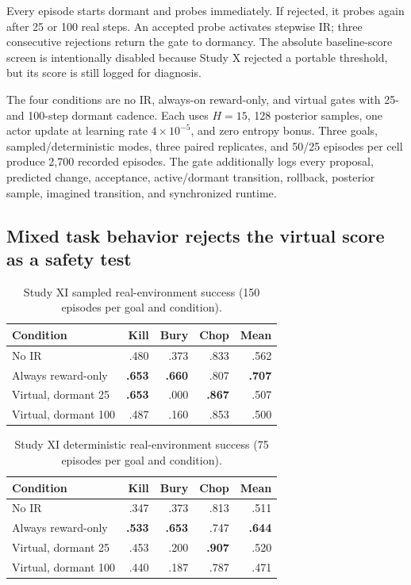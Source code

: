 \documentclass[10pt]{article}
\begin{document}
Every episode starts dormant and probes immediately. If rejected, it probes
again after 25 or 100 real steps. An accepted probe activates stepwise IR;
three consecutive rejections return the gate to dormancy. The absolute
baseline-score screen is intentionally disabled because Study X rejected a
portable threshold, but its score is still logged for diagnosis.

The four conditions are no IR, always-on reward-only, and virtual gates with
25- and 100-step dormant cadence. Each uses $H=15$, 128 posterior samples, one
actor update at learning rate $4\times10^{-5}$, and zero entropy bonus. Three
goals, sampled/deterministic modes, three paired replicates, and 50/25 episodes
per cell produce 2,700 recorded episodes. The gate additionally logs every
proposal, predicted change, acceptance, active/dormant transition, rollback,
posterior sample, imagined transition, and synchronized runtime.

\subsection{Mixed task behavior rejects the virtual score as a safety test}

\begin{table}[H]
\centering
\small
\caption{Study XI sampled real-environment success (150 episodes per goal and condition).}
\label{tab:stage5b2sampled}
\begin{tabular}{lrrrr}
\toprule
Condition & Kill & Bury & Chop & Mean \\
\midrule
No IR & .480 & .373 & .833 & .562 \\
Always reward-only & \textbf{.653} & \textbf{.660} & .807 & \textbf{.707} \\
Virtual, dormant 25 & \textbf{.653} & .000 & \textbf{.867} & .507 \\
Virtual, dormant 100 & .487 & .160 & .853 & .500 \\
\bottomrule
\end{tabular}
\end{table}

\begin{table}[H]
\centering
\small
\caption{Study XI deterministic real-environment success (75 episodes per goal and condition).}
\label{tab:stage5b2det}
\begin{tabular}{lrrrr}
\toprule
Condition & Kill & Bury & Chop & Mean \\
\midrule
No IR & .347 & .373 & .813 & .511 \\
Always reward-only & \textbf{.533} & \textbf{.653} & .747 & \textbf{.644} \\
Virtual, dormant 25 & .453 & .200 & \textbf{.907} & .520 \\
Virtual, dormant 100 & .440 & .187 & .787 & .471 \\
\bottomrule
\end{tabular}
\end{table}
\end{document}
